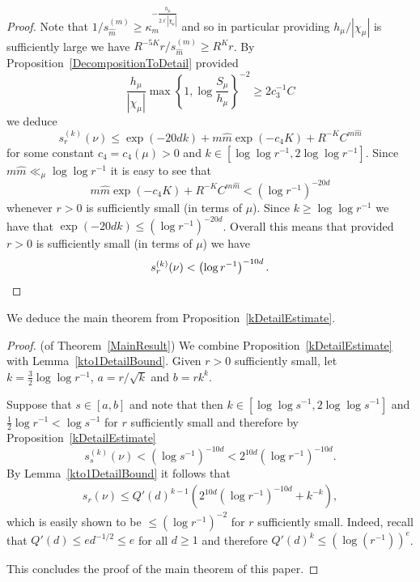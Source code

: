 \documentclass[10pt, english,oneside,reqno]{amsart}
\theoremstyle{plain}
\theoremstyle{remark}
\numberwithin{equation}{section}
\numberwithin{figure}{section}
\begin{document}
\begin{proof}
     Note that $1  / s_{\hat{m}}^{(m)} \geq \kappa_m^{-\frac{h_{\mu}}{2 \ell |\chi_{\mu}|}}$ and so in particular providing $h_{\mu} / |\chi_{\mu}|$ is sufficiently large we have $R^{-5K} r / s_{\hat{m}}^{(m)} \geq R^K r$. By Proposition~\ref{DecompositionToDetail} provided $$\frac{h_{\mu}}{|\chi_{\mu}|} \max \left\{1, \log \frac{S_{\mu}}{h_{\mu}} \right\}^{-2} \geq 2 c_3^{-1} C$$ we deduce
     \begin{equation*}
         s_r^{(k)}(\nu) \leq \exp(-20 d k) + m \hat{m} \exp(-c_4 K) + R^{-K} C^{m \hat{m}}
     \end{equation*}
     for some constant $c_4=c_4(\mu)>0$ and $k \in [\log \log r^{-1}, 2\log \log r^{-1}]$. Since $m \hat{m} \ll_{\mu} \log \log r^{-1}$ it is easy to see that $$m \hat{m} \exp(-c_4 K) + R^{-K} C^{m \hat{m}} < \left( \log r^{-1} \right)^{-20d}$$ whenever $r>0$ is sufficiently small (in terms of $\mu$). Since $k \geq \log \log r^{-1}$ we have that $\exp(-20dk) \leq \left( \log r^{-1} \right)^{-20 d}$. Overall this means that provided $r>0$ is sufficiently small (in terms of $\mu$) we have
     \begin{equation*}
         s_r^{(k)}(\nu) < \left( \log r^{-1} \right)^{-10 d}. \qedhere
     \end{equation*}
    
\end{proof}

We deduce the main theorem from Proposition~\ref{kDetailEstimate}.

\begin{proof}(of Theorem~\ref{MainResult})
    We combine Proposition~\ref{kDetailEstimate} with Lemma~\ref{kto1DetailBound}. Given $r > 0$ sufficiently small, let $k = \frac{3}{2} \log \log r^{-1}$, $a = r/\sqrt{k}$ and $b = rk^k$.

    Suppose that $s\in [a,b]$ and note that then $k \in [\log \log s^{-1}, 2\log\log s^{-1}]$ and $\frac{1}{2} \log r^{-1} < \log s^{-1}$ for $r$ sufficiently small and therefore by Proposition~\ref{kDetailEstimate} $$s_{s}^{(k)}(\nu) < (\log s^{-1})^{-10d} < 2^{10d}  (\log r^{-1})^{-10d}.$$ By Lemma~\ref{kto1DetailBound} it follows that 
    \begin{align*}
        s_r(\nu) \leq Q'(d)^{k-1}(2^{10d} (\log r^{-1})^{-10d} + k^{-k}),
    \end{align*}
    which is easily shown to be $\leq (\log r^{-1})^{-2}$ for $r$ sufficiently small. Indeed, recall that $Q'(d) \leq ed^{-1/2} \leq e$ for all $d \geq 1$ and therefore $Q'(d)^{k} \leq (\log(r^{-1}))^{e}$. 

    This concludes the proof of the main theorem of this paper. 
\end{proof}
\end{document}
